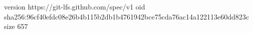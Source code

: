 version https://git-lfs.github.com/spec/v1
oid sha256:96cf40efdc08e26b4b115b2db1b4761942bce75cda76ac14a122113e60dd823c
size 657
